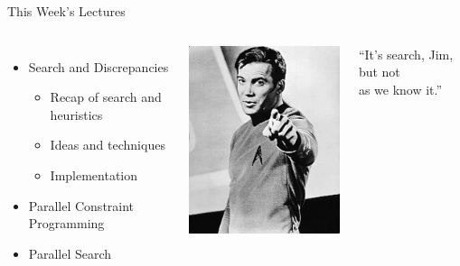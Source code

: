 \documentclass{beamer}
\begin{document}
\begin{frame}{This Week's Lectures}
    \begin{columns}
        \begin{itemize}
            \item \textcolor{uofgcobalt}{Search and Discrepancies}
                \begin{itemize}
                    \item Recap of search and heuristics
                    \item Ideas and techniques
                    \item Implementation
                \end{itemize}
            \item Parallel Constraint Programming
            \item Parallel Search
        \end{itemize}
        \centering\includegraphics*[keepaspectratio=true,scale=0.5]{search-but-not-as-we-know-it.jpg}
        \begin{center}``It's search, Jim, but not\\as we know it.''\end{center}
    \end{columns}
\end{frame}
\end{document}
